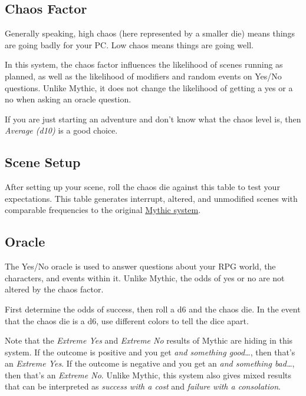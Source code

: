 \begin{multicols}{2}
\clearfloat{}

\subsection{Chaos Factor}
Generally speaking, high chaos (here represented by a smaller die) means things
are going badly for your PC\@. Low chaos means things are going well.

In this system, the chaos factor influences the likelihood of scenes running as
planned, as well as the likelihood of modifiers and random events on Yes/No
questions. Unlike Mythic, it does not change the likelihood of getting a yes or
a no when asking an oracle question.

If you are just starting an adventure and don't know what the chaos level is,
then \emph{Average (d10)} is a good choice.



\subsection{Scene Setup}
After setting up your scene, roll the chaos die against this table to test your
expectations. This table generates interrupt, altered, and unmodified scenes
with comparable frequencies to the original
\href{https://www.wordmillgames.com/mythic-gme.html}{Mythic system}.


\subsection{Oracle}
The Yes/No oracle is used to answer questions about your RPG world, the
characters, and events within it. Unlike Mythic, the odds of yes or no are not
altered by the chaos factor.

First determine the odds of success, then roll a d6 and the chaos die. In the
event that the chaos die is a d6, use different colors to tell the dice apart.

Note that the \emph{Extreme Yes} and \emph{Extreme No} results of Mythic are
hiding in this system. If the outcome is positive and you get \emph{and
something good\ldots}, then that's an \emph{Extreme Yes}. If the outcome is
negative and you get an \emph{and something bad\ldots}, then that's an
\emph{Extreme No}. Unlike Mythic, this system also gives mixed results that can
be interpreted as \emph{success with a cost} and \emph{failure with a
consolation}.



\vfill
\end{multicols}

